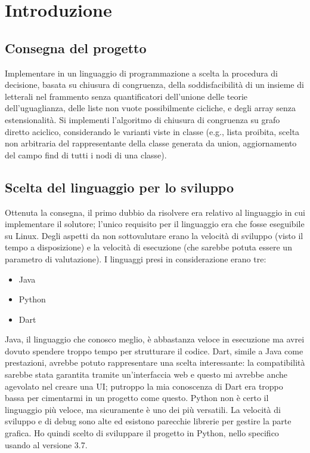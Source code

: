 \chapter{Introduzione}
\section{Consegna del progetto}
Implementare in un linguaggio di programmazione a scelta la procedura di decisione,
basata su chiusura di congruenza, della soddisfacibilità di un insieme di letterali nel
frammento senza quantificatori dell'unione delle teorie dell'uguaglianza, delle liste
non vuote possibilmente cicliche, e degli array senza estensionalità. Si implementi
l'algoritmo di chiusura di congruenza su grafo diretto aciclico, considerando le varianti
viste in classe (e.g., lista proibita, scelta non arbitraria del rappresentante della classe
generata da union, aggiornamento del campo find di tutti i nodi di una classe).
\section{Scelta del linguaggio per lo sviluppo}
Ottenuta la consegna, il primo dubbio da risolvere era relativo al linguaggio in cui implementare il solutore;
l'unico requisito per il linguaggio era che fosse eseguibile su Linux. Degli aspetti da non sottovalutare erano
la velocità di sviluppo (visto il tempo a disposizione) e la velocità di esecuzione (che sarebbe potuta essere un
parametro di valutazione). I linguaggi presi in considerazione erano tre:
\begin{itemize}
    \item Java
    \item Python
    \item Dart
\end{itemize}
Java, il linguaggio che conosco meglio, è abbastanza veloce in esecuzione ma avrei dovuto spendere troppo tempo per
strutturare il codice. Dart, simile a Java come prestazioni, avrebbe potuto rappresentare una scelta interessante: la
compatibilità sarebbe stata garantita tramite un'interfaccia web e questo mi avrebbe anche agevolato nel creare una UI;
putroppo la mia conoscenza di Dart era troppo bassa per cimentarmi in un progetto come questo. Python non è certo il
linguaggio più veloce, ma sicuramente è uno dei più versatili. La velocità di sviluppo e di debug sono alte ed esistono
parecchie librerie per gestire la parte grafica. Ho quindi scelto di sviluppare il progetto in Python, nello specifico
usando al versione 3.7.
